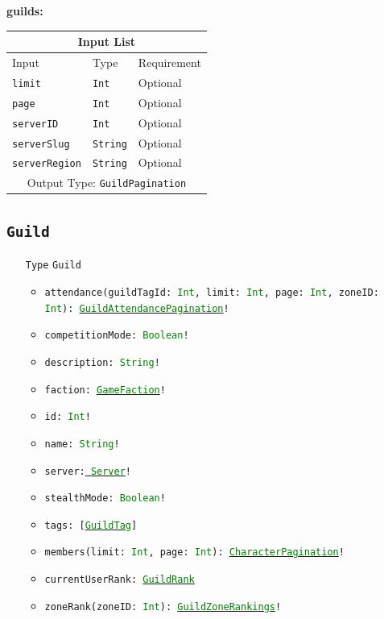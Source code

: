\documentclass[10pt, a4paper]{memoir}
\numberwithin{equation}{section}
\theoremstyle{plain}
\theoremstyle{defp}
\theoremstyle{dotless}
\theoremstyle{definition}
\theoremstyle{dotless}
\theoremstyle{dotless}
\theoremstyle{defp}
\theoremstyle{defp}
\theoremstyle{be}          %
\theoremstyle{defp}
\newcommand\ttt[1]{\texttt{#1}}
\newcommand\type[1]{\ttt{\textcolor{green}{#1}}}
\begin{document}
\medskip

\textbf{guilds:}

\begin{table}[h!]
	\centering
	\begin{tabular}{ |p{4.2cm}|p{6cm}|p{3cm}|  }
		\hline
		\multicolumn{3}{|c|}{Input List} \\
		\hline
		Input & Type & Requirement\\
		\hline
		\ttt{limit} & \ttt{Int} & Optional\\
		\ttt{page} & \ttt{Int} & Optional\\
		\ttt{serverID} & \ttt{Int} & Optional\\
		\ttt{serverSlug} & \ttt{String} & Optional\\
		\ttt{serverRegion} & \ttt{String} & Optional\\
		\hline
		\multicolumn{3}{|c|}{Output Type: \ttt{GuildPagination}} \\
		\hline
	\end{tabular}
\end{table}

\subsection{\ttt{Guild}}\label{sec:Guild}

\begin{itemize}[noitemsep,topsep=1pt]
	\item[\ttt{Type}] \ttt{Guild}
	\begin{itemize}[itemsep=1pt,topsep=1pt]
		\item \ttt{attendance(guildTagId: \type{Int}, limit: \type{Int}, page: \type{Int}, zoneID: \type{Int}): \hyperref[sec:guildattendancepagination]{\type{GuildAttendancePagination}}!}
		\item \ttt{competitionMode: \type{Boolean}!}
		\item \ttt{description: \type{String}!}
		\item \ttt{faction: \hyperref[sec:GameFaction]{\type{GameFaction}}!}
		\item \ttt{id: \type{Int}!}
		\item \ttt{name: \type{String}!}
		\item \ttt{server:\hyperref[sec:Server]{ \type{Server}}!}
		\item \ttt{stealthMode: \type{Boolean}!}
		\item \ttt{tags: [\hyperref[sec:GuildTag]{\type{GuildTag}}]}
		\item \ttt{members(limit: \type{Int}, page: \type{Int}): \hyperref[sec:characterpagination]{\type{CharacterPagination}}!}
		\item \ttt{currentUserRank: \hyperref[sec:GuildRank]{\type{GuildRank}}}
		\item \ttt{zoneRank(zoneID: \type{Int}): \hyperref[sec:GuildZoneRankings]{\type{GuildZoneRankings}}!}
	\end{itemize}
\end{itemize}
\end{document}
